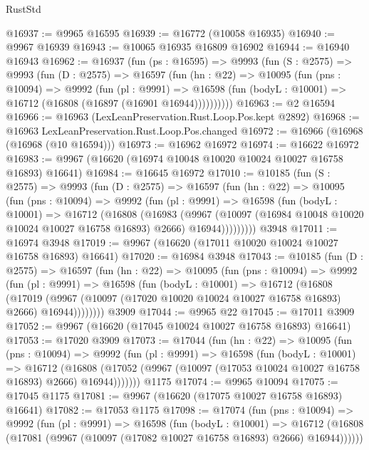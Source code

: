 \begin{lexlean}{RustStd}
\begin{coremodule}
{\begin{coremodule}
{{{{{{{{{{{{{{{{{{{{{{{{{{{{{{{{{{{{{{{{{{{{{{{{{{{{{{{{{{{{{{{{{{{{{{{{{{{{{{@16937 := @9965 @16595
@16939 := @16772 (@10058 @16935)
@16940 := @9967 @16939
@16943 := @10065 @16935 @16809 @16902
@16944 := @16940 @16943
@16962 := @16937
    (fun (ps : @16595) =>
    @9993
      (fun (S : @2575) =>
      @9993
        (fun (D : @2575) =>
        @16597
          (fun (hn : @22) =>
          @10095
            (fun (pns : @10094) =>
            @9992
              (fun (pl : @9991) =>
              @16598 (fun (bodyL : @10001) => @16712 (@16808 (@16897 (@16901 @16944))))))))))
@16963 := @2 @16594
@16966 := @16963 (LexLeanPreservation.Rust.Loop.Pos.kept @2892)
@16968 := @16963 LexLeanPreservation.Rust.Loop.Pos.changed
@16972 := @16966 (@16968 (@16968 (@10 @16594)))
@16973 := @16962 @16972
@16974 := @16622 @16972
@16983 := @9967 (@16620 (@16974 @10048 @10020 @10024 @10027 @16758 @16893) @16641)
@16984 := @16645 @16972
@17010 := @10185
    (fun (S : @2575) =>
    @9993
      (fun (D : @2575) =>
      @16597
        (fun (hn : @22) =>
        @10095
          (fun (pns : @10094) =>
          @9992
            (fun (pl : @9991) =>
            @16598
              (fun (bodyL : @10001) =>
              @16712
                (@16808
                  (@16983
                    (@9967
                      (@10097 (@16984 @10048 @10020 @10024 @10027 @16758 @16893) @2666)
                      @16944)))))))))
    @3948
@17011 := @16974 @3948
@17019 := @9967 (@16620 (@17011 @10020 @10024 @10027 @16758 @16893) @16641)
@17020 := @16984 @3948
@17043 := @10185
    (fun (D : @2575) =>
    @16597
      (fun (hn : @22) =>
      @10095
        (fun (pns : @10094) =>
        @9992
          (fun (pl : @9991) =>
          @16598
            (fun (bodyL : @10001) =>
            @16712
              (@16808
                (@17019
                  (@9967 (@10097 (@17020 @10020 @10024 @10027 @16758 @16893) @2666) @16944))))))))
    @3909
@17044 := @9965 @22
@17045 := @17011 @3909
@17052 := @9967 (@16620 (@17045 @10024 @10027 @16758 @16893) @16641)
@17053 := @17020 @3909
@17073 := @17044
    (fun (hn : @22) =>
    @10095
      (fun (pns : @10094) =>
      @9992
        (fun (pl : @9991) =>
        @16598
          (fun (bodyL : @10001) =>
          @16712
            (@16808 (@17052 (@9967 (@10097 (@17053 @10024 @10027 @16758 @16893) @2666) @16944)))))))
    @1175
@17074 := @9965 @10094
@17075 := @17045 @1175
@17081 := @9967 (@16620 (@17075 @10027 @16758 @16893) @16641)
@17082 := @17053 @1175
@17098 := @17074
    (fun (pns : @10094) =>
    @9992
      (fun (pl : @9991) =>
      @16598
        (fun (bodyL : @10001) =>
        @16712 (@16808 (@17081 (@9967 (@10097 (@17082 @10027 @16758 @16893) @2666) @16944))))))
}}}}}}}}}}}}}}}}}}}}}}}}}}}}}}}}}}}}}}}}}}}}}}}}}}}}}}}}}}}}}}}}}}}}}}}}}}}}}}
\end{coremodule}}
\end{coremodule}
\end{lexlean}
